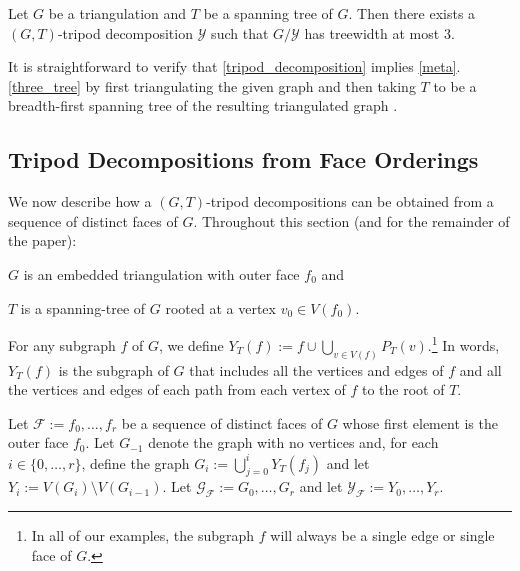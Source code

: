 \documentclass{patmorin}
\begin{document}
\begin{thm}\label{tripod_decomposition}
  Let $G$ be a triangulation and $T$ be a spanning tree of $G$.  Then there exists a $(G,T)$-tripod decomposition $\mathcal{Y}$ such that $G/\mathcal{Y}$ has treewidth at most $3$.
\end{thm}

It is straightforward to verify that \cref{tripod_decomposition} implies \cref{meta}.\ref{three_tree} by first triangulating the given graph and then taking $T$ to be a breadth-first spanning tree of the resulting triangulated graph \cite[Observation~35]{dujmovic.joret.ea:planar}.


\subsection{Tripod Decompositions from Face Orderings}
\label{orderings}

We now describe how a $(G,T)$-tripod decompositions can be obtained from a sequence of distinct faces of $G$.  Throughout this section (and for the remainder of the paper):
\begin{compactitem}
   \item $G$ is an embedded triangulation with outer face $f_0$ and
   \item $T$ is a spanning-tree of $G$ rooted at a vertex $v_0\in V(f_0)$.
\end{compactitem}
For any subgraph $f$ of $G$, we define $Y_T(f):=f\cup \bigcup_{v\in V(f)} P_T(v)$.\footnote{In all of our examples, the subgraph $f$ will always be a single edge or single face of $G$.}  In words, $Y_T(f)$ is the subgraph of $G$ that includes all the vertices and edges of $f$ and all the vertices and edges of each path from each vertex of $f$ to the root of $T$.

Let $\mathcal{F}:=f_0,\ldots,f_{r}$ be a sequence of distinct faces of $G$ whose first element is the outer face $f_0$. Let $G_{-1}$ denote the graph with no vertices and, for each $i\in\{0,\ldots,r\}$, define the graph $G_i:=\bigcup_{j=0}^i Y_T(f_j)$ and let $Y_i:=V(G_i)\setminus V(G_{i-1})$.  Let $\mathcal{G_F}:= G_0,\ldots,G_{r}$ and let $\mathcal{Y_F}:=Y_0,\ldots,Y_r$.  
\end{document}
